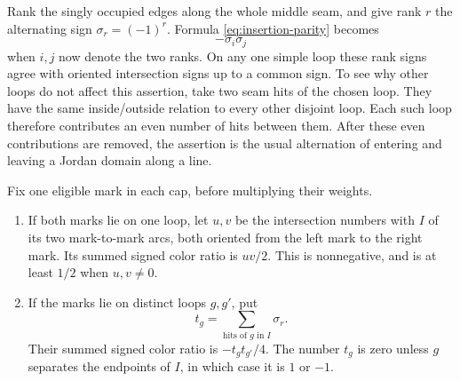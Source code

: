 Rank the singly occupied edges along the whole middle seam, and give
rank $r$ the alternating sign $\sigma_r=(-1)^r$.  Formula
\eqref{eq:insertion-parity} becomes
\begin{equation}
 -\sigma_i\sigma_j
 \label{eq:rank-insertion-sign}
\end{equation}
when $i,j$ now denote the two ranks.  On any one simple loop these rank
signs agree with oriented intersection signs up to a common sign.
To see why other loops do not affect this assertion, take two seam
hits of the chosen loop.  They have the same inside/outside relation
to every other disjoint loop.  Each such loop therefore contributes an
even number of hits between them.  After these even contributions are
removed, the assertion is the usual alternation of entering and
leaving a Jordan domain along a line.

\begin{lemma}
\label{lem:color-contractions}
Fix one eligible mark in each cap, before multiplying their weights.
\begin{enumerate}[label=\textnormal{(\roman*)}]
 \item If both marks lie on one loop, let $u,v$ be the intersection
 numbers with $I$ of its two mark-to-mark arcs, both oriented from the
 left mark to the right mark.  Its summed signed color ratio is
 $uv/2$.  This is nonnegative, and is at least $1/2$ when $u,v\ne0$.
 \item If the marks lie on distinct loops $g,g'$, put
 \[
 t_g=\sum_{\text{hits of }g\text{ in }I}\sigma_r.
 \]
 Their summed signed color ratio is $-t_gt_{g'}/4$.  The number $t_g$
 is zero unless $g$ separates the endpoints of $I$, in which case it
 is $1$ or $-1$.
\end{enumerate}
\end{lemma}

